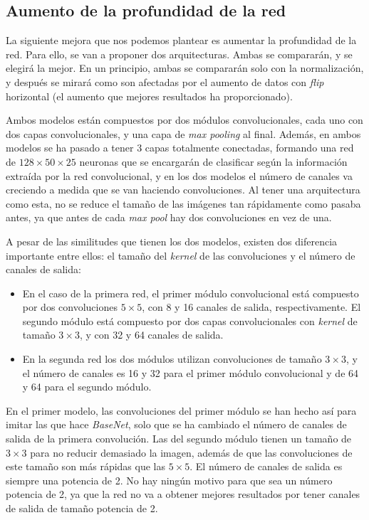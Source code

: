 \documentclass[11pt,a4paper]{article}
\begin{document}
\subsection{Aumento de la profundidad de la red}

La siguiente mejora que nos podemos plantear es aumentar la profundidad de la red. Para ello, se van a proponer dos
arquitecturas. Ambas se compararán, y se elegirá la mejor. En un principio, ambas se compararán solo con la normalización,
y después se mirará como son afectadas por el aumento de datos con \textit{flip} horizontal (el aumento que mejores resultados
ha proporcionado).

Ambos modelos están compuestos por dos módulos convolucionales, cada uno con dos capas convolucionales, y una capa
de \textit{max pooling} al final. Además, en ambos modelos se ha pasado a tener 3 capas totalmente conectadas, formando
una red de $128 \times 50 \times 25$ neuronas que se encargarán de clasificar según la información extraída por la red
convolucional, y en los dos modelos el número de canales va creciendo a medida que se van haciendo convoluciones.
Al tener una arquitectura como esta, no se reduce el tamaño de las imágenes tan rápidamente como pasaba antes,
ya que antes de cada \textit{max pool} hay dos convoluciones en vez de una.

A pesar de las similitudes que tienen los dos modelos, existen dos diferencia importante entre ellos: el tamaño del
\textit{kernel} de las convoluciones y el número de canales de salida:

\begin{itemize}
  \item En el caso de la primera red, el primer módulo convolucional está compuesto por dos convoluciones $5 \times 5$, con
  8 y 16 canales de salida, respectivamente. El segundo módulo está compuesto por dos capas convolucionales con \textit{kernel}
  de tamaño $3 \times 3$, y con 32 y 64 canales de salida.
  \item En la segunda red los dos módulos utilizan convoluciones de tamaño $3 \times 3$, y el número de canales es 16 y 32 para
  el primer módulo convolucional y de 64 y 64 para el segundo módulo.
\end{itemize}

En el primer modelo, las convoluciones del primer módulo se han hecho así para imitar las que hace \textit{BaseNet}, solo
que se ha cambiado el número de canales de salida de la primera convolución. Las del segundo módulo tienen un tamaño
de $3 \times 3$ para no reducir demasiado la imagen, además de que las convoluciones de este tamaño son más rápidas
que las $5 \times 5$. El número de canales de salida es siempre una potencia de 2. No hay ningún motivo para que
sea un número potencia de 2, ya que la red no va a obtener mejores resultados por tener canales de salida de tamaño
potencia de 2.
\end{document}

